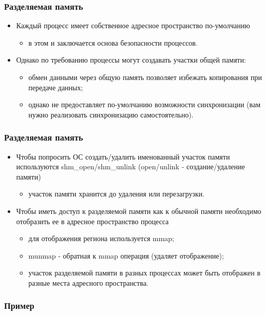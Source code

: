 \begin{frame}
\frametitle{Разделяемая память}
\begin{itemize}
  \item Каждый процесс имеет собственное адресное пространство по-умолчанию
  \begin{itemize}
    \item в этом и заключается основа безопасности процессов.
  \end{itemize}
  \item Однако по требованию процессы могут создавать участки общей памяти:
  \begin{itemize}
    \item обмен данными через общую память позволяет избежать копирования при
    передаче данных;
    \item однако не предоставляет по-умолчанию возможности синхронизации (вам
    нужно реализовать синхронизацию самостоятельно).
  \end{itemize}
\end{itemize}
\end{frame}

\begin{frame}
\frametitle{Разделяемая память}
\begin{itemize}
  \item Чтобы попросить ОС создать/удалить именованный участок памяти
  используются shm\_open/shm\_unlink (open/unlink - создание/удаление памяти)
  \begin{itemize}
    \item участок памяти хранится до удаления или перезагрузки.
  \end{itemize}
  \item Чтобы иметь доступ к разделяемой памяти как к обычной памяти необходимо
  отобразить ее в адресное пространство процесса
  \begin{itemize}
    \item для отображения региона используется mmap;
    \item munmap - обратная к mmap операция (удаляет отображение);
    \item участок разделяемой памяти в разных процессах может быть отображен в
    разные места адресного пространства.
  \end{itemize}
\end{itemize}
\end{frame}

\begin{frame}[fragile]
\frametitle{Пример}

\end{frame}
